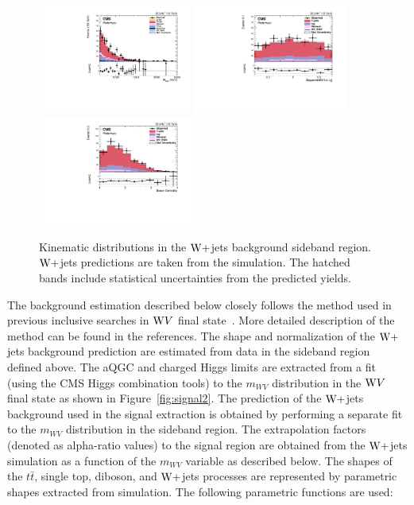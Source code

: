 \begin{figure}[!htbp]
\includegraphics[width=0.45\textwidth]{Plots/plots/DibosonBoostedElMuCuts13TeV_WjetControlRegion_Tighter_CHS_mass_lvj_type0_PuppiAK8.pdf}
\includegraphics[width=0.45\textwidth]{Plots/plots/DibosonBoostedElMuCuts13TeV_WjetControlRegion_Tighter_CHS_ZeppenfeldWH_new.pdf}
\includegraphics[width=0.45\textwidth]{Plots/plots/DibosonBoostedElMuCuts13TeV_WjetControlRegion_Tighter_CHS_BosonCentrality_type0.pdf}
\caption{Kinematic distributions in the $\mathrm{W}+$jets background sideband region. $\mathrm{W}+$jets predictions are taken from the simulation. The hatched bands include statistical uncertainties from the predicted yields.}
\label{fig:wjet_control2}
\end{figure}

The background estimation described below closely follows the method used in previous inclusive searches in $\mathrm{W} V$ final state~\cite{Gunion1986,resonances,cmsnote}. More detailed description of the method can be found in the references. The shape and normalization of the $\mathrm{W}+$jets background prediction are estimated from data in the sideband region defined above. The aQGC and charged Higgs limits are extracted from a fit (using the CMS Higgs combination tools) to the $m_{WV}$ distribution in the $\mathrm{W} V$ final state as shown in Figure~\ref{fig:signal2}. The prediction of the $\mathrm{W}+$jets background used in the signal extraction is obtained by performing a separate fit to the $m_{WV}$ distribution in the sideband region. The extrapolation factors (denoted as alpha-ratio values) to the signal region are obtained from the $\mathrm{W}+$jets simulation as a function of the $m_{WV}$ variable as described below. The shapes of the $t\bar{t}$, single top, diboson, and $\mathrm{W}+$jets processes are represented by parametric shapes extracted from simulation. The following parametric functions are used: 

